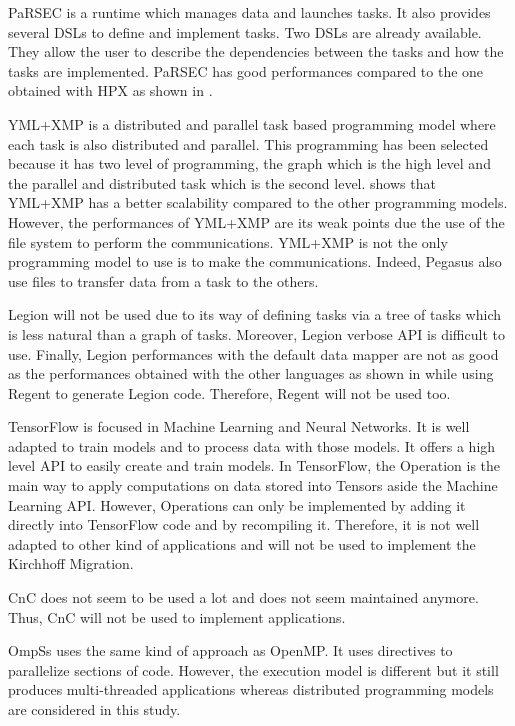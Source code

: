 PaRSEC is a runtime which manages data and launches tasks.
It also provides several DSLs to define and implement tasks.
Two DSLs are already available.
They allow the user to describe the dependencies between the tasks and how the tasks are implemented.
PaRSEC has good performances compared to the one obtained with HPX as shown in \cite{GurhP2020} .

YML+XMP is a distributed and parallel task based programming model where each task is also distributed and parallel.
This programming has been selected because it has two level of programming, the graph which is the high level and the parallel and distributed task which is the second level.
\cite{GurhP2020} shows that YML+XMP has a better scalability compared to the other programming models.
However, the performances of YML+XMP are its weak points due the use of the file system to perform the communications.
YML+XMP is not the only programming model to use is to make the communications.
Indeed, Pegasus also use files to transfer data from a task to the others.

Legion will not be used due to its way of defining tasks via a tree of tasks which is less natural than a graph of tasks.
Moreover, Legion verbose API is difficult to use.
Finally, Legion performances with the default data mapper are not as good as the performances obtained with the other languages as shown in \cite{GurhP2020} while using Regent to generate Legion code.
Therefore, Regent will not be used too.


TensorFlow is focused in Machine Learning and Neural Networks.
It is well adapted to train models and to process data with those models.
It offers a high level API to easily create and train models.
In TensorFlow, the Operation is the main way to apply computations on data stored into Tensors aside the Machine Learning API.
However, Operations can only be implemented by adding it directly into TensorFlow code and by recompiling it.
Therefore, it is not well adapted to other kind of applications and will not be used to implement the Kirchhoff Migration.

CnC does not seem to be used a lot and does not seem maintained anymore.
Thus, CnC will not be used to implement applications.

OmpSs uses the same kind of approach as OpenMP.
It uses directives to parallelize sections of code.
However, the execution model is different but it still produces multi-threaded applications whereas distributed programming models are considered in this study.

